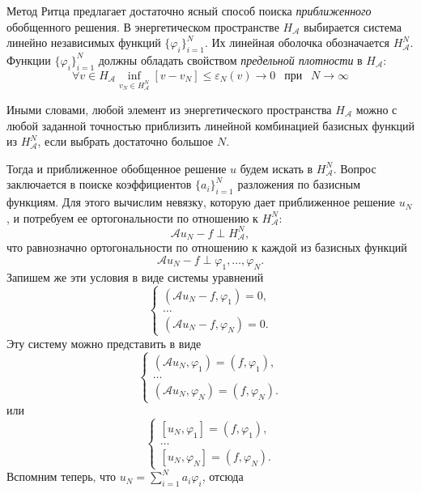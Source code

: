 \documentclass[a4paper, 11pt]{article}
\begin{document}
Метод Ритца предлагает достаточно ясный способ поиска \textit{приближенного} обобщенного решения. В энергетическом пространстве $H_\mathcal{A}$ выбирается система линейно независимых функций $\{\varphi_i\}_{i=1}^N$. Их линейная оболочка обозначается $H_{\mathcal{A}}^N$. Функции $\{\varphi_i\}_{i=1}^N$ должны обладать свойством \textit{предельной плотности} в $H_\mathcal{A}$:
\begin{equation}\label{eq:ritz_lim_dens}
\forall v \in H_\mathcal{A}
	\inf_{v_N \in H_{\mathcal{A}}^N}[v - v_N] \le \varepsilon_N(v) \rightarrow 0~~\text{ при } ~~N \rightarrow \infty
\end{equation}

Иными словами, любой элемент из энергетического пространства $H_\mathcal{A}$ можно с любой заданной точностью приблизить линейной комбинацией базисных функций из $H_\mathcal{A}^N$, если выбрать достаточно большое $N$.

Тогда и приближенное обобщенное решение $u$ будем искать в  $H_{\mathcal{A}}^N$. Вопрос заключается в поиске коэффициентов $\{a_i\}_{i=1}^N$ разложения по базисным функциям. Для этого вычислим невязку, которую дает приближенное решение $u_N$, и потребуем ее ортогональности по отношению к $H_{\mathcal{A}}^N$:
\begin{equation}
\mathcal{A}u_N - f \perp H_{\mathcal{A}}^N,
\end{equation}
что равнозначно ортогональности по отношению к каждой из базисных функций
\begin{equation}
\mathcal{A}u_N - f \perp \varphi_1, \dots, \varphi_N.
\end{equation}
Запишем же эти условия в виде системы уравнений
\begin{equation}
\begin{cases}
\left(\mathcal{A}u_N - f, \varphi_1\right) = 0,\\
\dots \\
\left(\mathcal{A}u_N - f, \varphi_N\right) = 0.
\end{cases}
\end{equation}
Эту систему можно представить в виде
\begin{equation}
\begin{cases}
\left(\mathcal{A}u_N, \varphi_1\right) = (f,\varphi_1),\\
\dots \\
\left(\mathcal{A}u_N, \varphi_N\right) = (f,\varphi_N).
\end{cases}
\end{equation}
или
\begin{equation}
\begin{cases}
[u_N, \varphi_1] = (f,\varphi_1),\\
\dots \\
[u_N, \varphi_N] = (f,\varphi_N).
\end{cases}
\end{equation}
Вспомним теперь, что $u_N = \sum_{i=1}^Na_i\varphi_i$, отсюда
\end{document}
